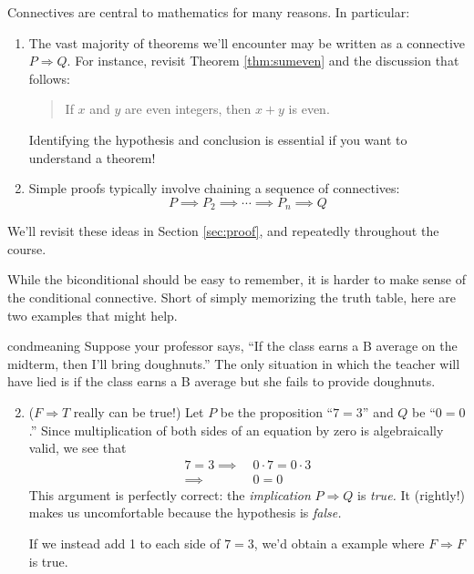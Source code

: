 Connectives are central to mathematics for many reasons. In particular:
\begin{enumerate}
  \item The vast majority of theorems we'll encounter may be written as a connective $P\Longrightarrow Q$. For instance, revisit Theorem \ref{thm:sumeven} and the discussion that follows:
  \begin{quote}
  	If $x$ and $y$ are even integers, then $x+y$ is even.
  \end{quote}
  Identifying the hypothesis and conclusion is essential if you want to understand a theorem!
  \item Simple proofs typically involve chaining a sequence of connectives:
  \[P\implies P_2\implies \cdots \implies P_n\implies Q\]
\end{enumerate}
We'll revisit these ideas in Section \ref{sec:proof}, and repeatedly throughout the course.\bigbreak


While the biconditional should be easy to remember, it is harder to make sense of the conditional connective. Short of simply memorizing the truth table, here are two examples that might help.

\begin{examples}{}{condmeaning}
	\exstart Suppose your professor says, ``If the class earns a B average on the midterm, then I'll bring doughnuts.'' The only situation in which the teacher will have lied is if the class earns a B average but she fails to provide doughnuts.
	\begin{enumerate}\setcounter{enumi}{1}
	  \item ($F\Longrightarrow T$ really can be true!) Let $P$ be the proposition ``$7=3$'' and $Q$ be ``$0=0$.'' Since multiplication of both sides of an equation by zero is algebraically valid, we see that
	  \begin{align*}
			7=3\implies\ &0\cdot 7=0\cdot 3\tag*{(If $7=3$, then 0 times 7 equals 0 times 3)}\\
			\implies\ &0=0\tag*{(then 0 equals 0)}
		\end{align*}
	  This argument is perfectly correct: the \emph{implication} $P\Longrightarrow Q$ is \emph{true.} It (rightly!) makes us uncomfortable because the hypothesis is \emph{false.}\par
	  If we instead add 1 to each side of $7=3$, we'd obtain a example where $F\Longrightarrow F$ is true.
	\end{enumerate}
\end{examples}


